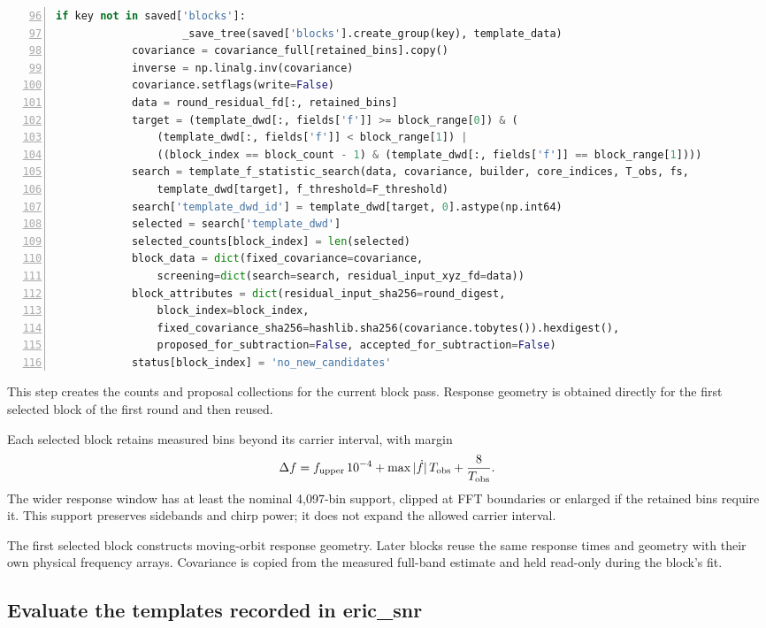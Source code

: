 \documentclass[11pt,a4paper]{article}
\begin{document}
\begin{lstlisting}[language=Python,firstnumber=96,numbers=left,showlines=true]
                if key not in saved['blocks']:
                    _save_tree(saved['blocks'].create_group(key), template_data)
            covariance = covariance_full[retained_bins].copy()
            inverse = np.linalg.inv(covariance)
            covariance.setflags(write=False)
            data = round_residual_fd[:, retained_bins]
            target = (template_dwd[:, fields['f']] >= block_range[0]) & (
                (template_dwd[:, fields['f']] < block_range[1]) |
                ((block_index == block_count - 1) & (template_dwd[:, fields['f']] == block_range[1])))
            search = template_f_statistic_search(data, covariance, builder, core_indices, T_obs, fs,
                template_dwd[target], f_threshold=F_threshold)
            search['template_dwd_id'] = template_dwd[target, 0].astype(np.int64)
            selected = search['template_dwd']
            selected_counts[block_index] = len(selected)
            block_data = dict(fixed_covariance=covariance,
                screening=dict(search=search, residual_input_xyz_fd=data))
            block_attributes = dict(residual_input_sha256=round_digest,
                block_index=block_index,
                fixed_covariance_sha256=hashlib.sha256(covariance.tobytes()).hexdigest(),
                proposed_for_subtraction=False, accepted_for_subtraction=False)
            status[block_index] = 'no_new_candidates'
\end{lstlisting}

This step creates the counts and proposal collections for the current block
pass. Response geometry is obtained directly for the first selected block of
the first round and then reused.


Each selected block retains measured bins beyond its carrier
interval, with margin
\[
\Delta f=f_{\rm upper}\,10^{-4}
      +\max|\dot f|\,T_{\rm obs}+\frac{8}{T_{\rm obs}}.
\]
The wider response window has at least the nominal 4,097-bin support, clipped
at FFT boundaries or enlarged if the retained bins require it. This support
preserves sidebands and chirp power; it does not expand the allowed carrier interval.

The first selected block constructs moving-orbit response geometry. Later blocks
reuse the same response times and geometry with their own physical frequency
arrays. Covariance is copied from the measured full-band estimate and held
read-only during the block's fit.

\subsection{Evaluate the templates recorded in eric\_snr}
\end{document}
